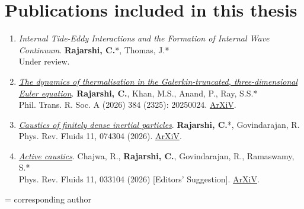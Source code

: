 \documentclass[11pt,a4paper,twoside]{book}
\begin{document}
\chapter*{Publications included in this thesis}
\begin{enumerate}[leftmargin=*]
\item \emph{Internal Tide-Eddy Interactions and the Formation of Internal Wave Continuum}. \textbf{Rajarshi, C.}*, Thomas, J.*\\
Under review.

\item \emph{\href{https://doi.org/10.1098/rsta.2025.0024}{The dynamics of thermalisation in the Galerkin-truncated, three-dimensional Euler equation}}. \textbf{Rajarshi, C.}, Khan, M.S., Anand, P., Ray, S.S.*\\
Phil. Trans. R. Soc. A (2026) 384 (2325): 20250024. \href{https://arxiv.org/abs/2512.10788}{ArXiV}.

\item \emph{\href{https://doi.org/10.1103/fwkk-s3w4}{Caustics of finitely dense inertial particles}}. \textbf{Rajarshi, C.}*, Govindarajan, R.\\
Phys. Rev. Fluids 11, 074304 (2026). \href{https://arxiv.org/abs/2601.14179}{ArXiV}.

\item \emph{\href{https://doi.org/10.1103/m3v2-bdvj}{Active caustics}}. Chajwa, R., \textbf{Rajarshi, C.}, Govindarajan, R., Ramaswamy, S.*\\
Phys. Rev. Fluids 11, 033104 (2026) [Editors' Suggestion]. \href{https://doi.org/10.48550/arXiv.2310.01829}{ArXiV}.
\end{enumerate}
\noindent * = corresponding author
\end{document}
